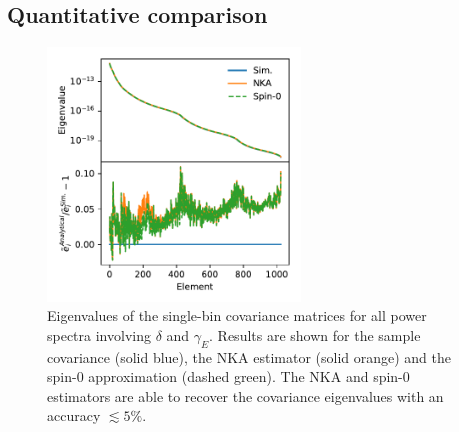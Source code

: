 \documentclass[a4paper,11pt]{article}
\begin{document}
    \subsection{Quantitative comparison}\label{ssec:results.quant}
      \begin{figure}
        \centering
        \includegraphics[width=0.6\textwidth]{./figures/run_sph_2b_NKA_TTTEEE_reldev_eigval_1stbin.pdf}
        \caption{Eigenvalues of the single-bin covariance matrices for all power spectra involving $\delta$ and $\gamma_E$. Results are shown for the sample covariance (solid blue), the NKA estimator (solid orange) and the spin-0 approximation (dashed green). The NKA and spin-0 estimators are able to recover the covariance eigenvalues with an accuracy $\lesssim5\%$.} \label{fig:eigv_1bin}
      \end{figure}
\end{document}
